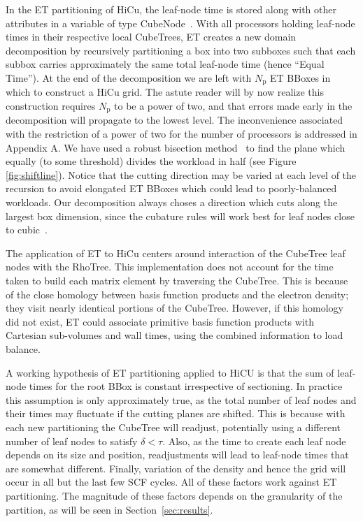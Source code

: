 \commentoutA{\documentclass[prl,aps,twocolumn,showpacs,twocolumngrid,superbib]{revtex4}}
\newcommand{\Np}{N_{\mathrm{p}}} \newcommand{\Nbox}{N_{\mathrm{b}}}
\begin{document}
In the ET partitioning of HiCu, the leaf-node time is stored along with other
attributes in a variable of type CubeNode~\cite{MChallacombe00A}.
With all processors holding leaf-node times in their respective local
CubeTrees, ET creates a new domain decomposition by recursively
partitioning a box into two subboxes such that each subbox carries
approximately the same total leaf-node time (hence ``Equal Time'').
At the end of the decomposition we are left with $\Np$ ET BBoxes in
which to construct a HiCu grid.  The astute reader will by now realize
this construction requires $\Np$ to be a power of two, and that errors
made early in the decomposition will propagate to the lowest level.
The inconvenience associated with the restriction of a power of two for the 
number of processors is addressed in Appendix A. 
We have used a robust bisection
method~\cite{WPress92} to find the plane which equally (to some
threshold) divides the workload in half (see Figure
\ref{fig:shiftline}). Notice that the cutting direction may be varied
at each level of the recursion to avoid elongated ET BBoxes which
could lead to poorly-balanced workloads. Our decomposition always
choses a direction which cuts along the largest box dimension, since
the cubature rules will work best for leaf nodes close to cubic~\cite{Stroud71}.

The application of ET to HiCu centers around interaction of the 
CubeTree leaf nodes with the RhoTree.  This implementation does not account
for the time taken to build each matrix element by traversing the CubeTree.
This is because of the close homology between basis function products
and the electron density; they visit nearly identical portions of the
CubeTree.  However, if this homology did not exist, ET  could
associate primitive basis function products with Cartesian sub-volumes 
and wall times, using the combined information to load balance.

A working hypothesis of ET partitioning applied to HiCU is that the sum of 
leaf-node times for the root BBox is constant irrespective of sectioning.  In
practice this assumption is only approximately true, as the total number of leaf nodes and
their times may fluctuate if the cutting planes are shifted. This is 
because with each new partitioning the CubeTree will
readjust, potentially using a different number of leaf nodes to satisfy
$\delta<\tau$.  Also, as the time to create each leaf node depends on
its size and position, readjustments will lead to leaf-node times that
are somewhat different. Finally, variation of the density and hence
the grid will occur in all but the last few SCF cycles.  All of these
factors work against ET partitioning.  The magnitude of these factors
depends on the granularity of the partition, as will be seen in 
Section~\ref{sec:results}.
\end{document}

